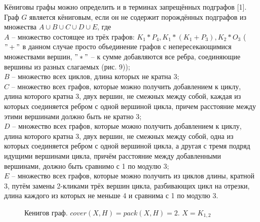 \documentclass[12pt]{article}
\begin{document}
Кёниговы графы можно определить и в терминах запрещённых подграфов [1]. Граф $G$ является кёниговым, если он не содержит порождённых подграфов из множества
$A\cup B\cup C \cup D \cup E$, где 
\\ $A$ -- множество состоящее из трёх графов: $K_1*P_4, K_1*(K_1+P_3), K_2*O_3$ ($"+"$ в данном случае просто объединение графов с непересекающимися множествами вершин, $"*"$ -- к сумме добавляются все ребра, соединяющие вершины из разных слагаемых (рис. 9));
\\ $B$ -- множество всех циклов, длина которых не кратна 3;
\\ $C$ -- множество всех графов, которые можно получить добавлением к циклу, длина которого кратна 3, двух вершин, не смежных между собой, каждая из которых соединяется ребром с одной вершиной цикла, причем расстояние между этими вершинами должно быть не кратно 3;
\\ $D$ -- множество всех графов, которые можно получить добавлением к циклу, длина которого кратна 3, двух вершин, не смежных между собой, одна из которых соединяется ребром с одной вершиной цикла, а другая с тремя подряд идущими вершинами цикла, причём расстояние между добавленными вершинами, должно быть сравнимо с 1 по модулю 3; 
\\ $E$ -- множество всех графов, которые можно получить из циклов  длины, кратной 3, путём замены 2-кликами трёх вершин цикла, разбивающих цикл на отрезки, длина каждого из которых не меньше 4 и сравнима с 1 по модулю 3.

\begin{figure}
	\label{pic8}
	\caption{Кенигов граф. $cover(X,H)=pack(X,H)=2$. $X=K_{1,2}$}
\end{figure}
\end{document}
